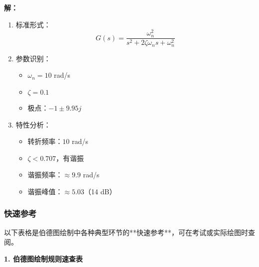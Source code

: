\begin{tcolorbox}[colback=blue!5!white,colframe=blue!75!black,title=例3求解过程与伯德图]

\begin{minipage}[t]{0.47\textwidth}
\textbf{解：}
\begin{enumerate}
    \item 标准形式：
    $$G(s) = \frac{\omega_n^2}{s^2 + 2\zeta\omega_n s + \omega_n^2}$$
    
    \item 参数识别：
    \begin{itemize}
        \item $\omega_n = 10$ rad/s
        \item $\zeta = 0.1$
        \item 极点：$-1 \pm 9.95j$
    \end{itemize}
    
    \item 特性分析：
    \begin{itemize}
        \item 转折频率：$10$ rad/s
        \item $\zeta < 0.707$，有谐振
        \item 谐振频率：$\approx 9.9$ rad/s
        \item 谐振峰值：$\approx 5.03$（14 dB）
    \end{itemize}
\end{enumerate}
\end{minipage}\hfill
\begin{minipage}[t]{0.47\textwidth}
\end{minipage}

\end{tcolorbox}

\subsubsection{快速参考}

以下表格是伯德图绘制中各种典型环节的**快速参考**，可在考试或实际绘图时查阅。

\textbf{1. 伯德图绘制规则速查表}

